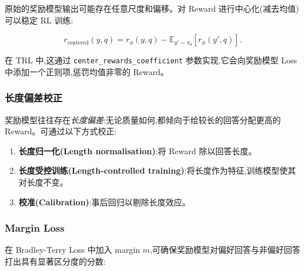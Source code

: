 原始的奖励模型输出可能存在任意尺度和偏移。对 Reward 进行中心化(减去均值)可以稳定 RL 训练:

\[
r_{\text{centered}}(y, q) = r_\phi(y, q) - \mathbb{E}_{y' \sim \pi_\theta}[r_\phi(y', q)].
\]

在 TRL 中,这通过 \texttt{center\_rewards\_coefficient} 参数实现,它会向奖励模型 Loss 中添加一个正则项,惩罚均值非零的 Reward。

\subsubsection*{长度偏差校正}
\label{length-bias-correction}

奖励模型往往存在\emph{长度偏差}:无论质量如何,都倾向于给较长的回答分配更高的 Reward。可通过以下方式校正:

\begin{enumerate}
  \item \textbf{长度归一化(Length normalisation)}:将 Reward 除以回答长度。
  \item \textbf{长度受控训练(Length-controlled training)}:将长度作为特征,训练模型使其对长度不变。
  \item \textbf{校准(Calibration)}:事后回归以剔除长度效应。
\end{enumerate}

\subsubsection*{Margin Loss}
\label{margin-losses}

在 Bradley-Terry Loss 中加入 margin $m$,可确保奖励模型对偏好回答与非偏好回答打出具有显著区分度的分数:


